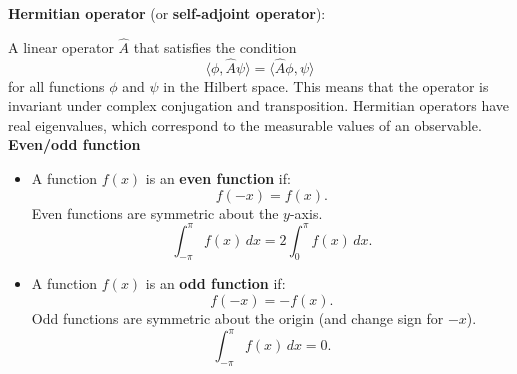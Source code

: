\documentclass[a4paper,12pt]{article}
\begin{document}
\begin{footnotesize}
\begin{multicols}{3}
\textbf{Hermitian operator} (or \textbf{self-adjoint operator}):

A linear operator \( \hat{A} \) that satisfies the condition
\[
\langle \phi, \hat{A} \psi \rangle = \langle \hat{A} \phi, \psi \rangle
\]
for all functions \( \phi \) and \( \psi \) in the Hilbert space. This means that the operator is invariant under complex conjugation and transposition. Hermitian operators have real eigenvalues, which correspond to the measurable values of an observable.
\\

\textbf{Even/odd function}
\begin{itemize}
        \item A function \(f(x)\) is an \textbf{even function} if:
        \[
        f(-x) = f(x).
        \]
        Even functions are symmetric about the \(y\)-axis.
    \[
    \int_{-\pi}^\pi f(x) \, dx = 2 \int_0^\pi f(x) \, dx.
    \]
        
        \item A function \(f(x)\) is an \textbf{odd function} if:
        \[
        f(-x) = -f(x).
        \]
        Odd functions are symmetric about the origin (and change sign for \(-x\)).
    \[
    \int_{-\pi}^\pi f(x) \, dx = 0.
    \]
    \end{itemize}



\end{multicols}

\end{footnotesize}
\end{document}
